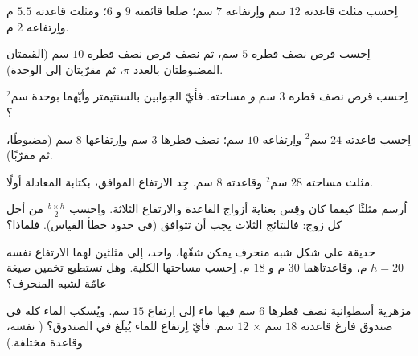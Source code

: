 \begin{exercise}[$\star$]\label{exo:g7:areas:3}
اِحسب  مثلث قاعدته $12$ سم واِرتفاعه $7$ سم؛
 ضلعا قائمته $9$ و $6$؛ ومثلث قاعدته
$5.5$ م واِرتفاعه $2$ م.
\end{exercise}

\begin{exercise}[$\star$]\label{exo:g7:areas:4}
اِحسب  قرص نصف قطره $5$ سم، ثم  نصف قرص
نصف قطره $10$ سم (القيمتان المضبوطتان بالعدد $\pi$، ثم مقرّبتان إلى الوحدة).
\end{exercise}

\begin{exercise}[$\star$]\label{exo:g7:areas:5}
اِحسب  قرص نصف قطره $3$ سم \emph{و} مساحته.
فأيّ الجوابين بالسنتيمتر وأيّهما بوحدة سم$^2$؟
\end{exercise}

\begin{exercise}[$\star$]\label{exo:g7:areas:6}
اِحسب    قاعدته $24$ سم$^2$ واِرتفاعه
$10$ سم؛   نصف قطرها $3$ سم واِرتفاعها $8$ سم (مضبوطًا،
ثم مقرّبًا).
\end{exercise}

\begin{exercise}[$\star$]\label{exo:g7:areas:7}
مثلث مساحته $28$ سم$^2$ وقاعدته $8$ سم. جِد
الارتفاع الموافق، بكتابة المعادلة أولًا.
\end{exercise}

\begin{exercise}[$\star\star$]\label{exo:g7:areas:8}
اُرسم مثلثًا كيفما كان وقِس بعناية أزواج القاعدة والارتفاع الثلاثة.
واِحسب $\frac{b \times h}{2}$ من أجل كل زوج: فالنتائج الثلاث يجب أن
تتوافق (في حدود خطأ القياس). فلماذا؟
\end{exercise}

\begin{exercise}[$\star\star$]\label{exo:g7:areas:9}
حديقة على شكل شبه منحرف يمكن شقّها،  واحد، إلى
مثلثين لهما الارتفاع نفسه $h = 20$ م، وقاعدتاهما $30$ م و
$18$ م. اِحسب مساحتها الكلية. وهل تستطيع تخمين صيغة عامّة
لشبه المنحرف؟
\end{exercise}

\begin{exercise}[$\star\star$]\label{exo:g7:areas:10}
مزهرية أسطوانية نصف قطرها $6$ سم فيها ماء إلى اِرتفاع
$15$ سم. ويُسكب الماء كله في صندوق فارغ
قاعدته $18$ سم $\times$ $12$ سم. فأيّ اِرتفاع للماء يُبلَغ في
الصندوق؟ ( نفسه، وقاعدة مختلفة.)
\end{exercise}

